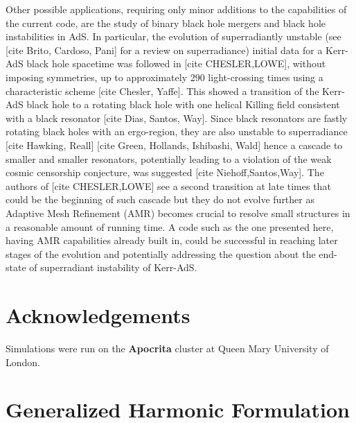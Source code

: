 \documentclass[a4paper,11pt]{article}
\begin{document}
Other possible applications, requiring only minor additions to the capabilities of the current code, are the study of binary black hole mergers and black hole instabilities in AdS. In particular, the evolution of superradiantly unstable (see [cite Brito, Cardoso, Pani] for a review on superradiance) initial data for a Kerr-AdS black hole spacetime was followed in [cite CHESLER,LOWE], without imposing symmetries, up to approximately 290 light-crossing times using a characteristic scheme [cite Chesler, Yaffe]. This showed a transition of the Kerr-AdS black hole to a rotating black hole with one helical Killing field consistent with a black resonator [cite Dias, Santos, Way]. Since black resonators are fastly rotating black holes with an ergo-region, they are also unstable to superradiance [cite  Hawking, Reall] [cite Green, Hollands, Ishibashi, Wald] hence a cascade to smaller and smaller resonators, potentially leading to a violation of the weak cosmic censorship conjecture, was suggested [cite Niehoff,Santos,Way]. The authors of [cite CHESLER,LOWE] see a second transition at late times that could be the beginning of such cascade but they do not evolve further as Adaptive Mesh Refinement (AMR) becomes crucial to resolve small structures in a reasonable amount of running time. A code such as the one presented here, having AMR capabilities already built in, could be successful in reaching later stages of the evolution and potentially addressing the question about the end-state of superradiant instability of Kerr-AdS.



\section*{Acknowledgements}
Simulations were run on the {\bf Apocrita} cluster at Queen Mary University of London.

\appendix
\setcounter{tocdepth}{1}
\section{Generalized Harmonic Formulation}
\label{sec:GHfor}
\end{document}
